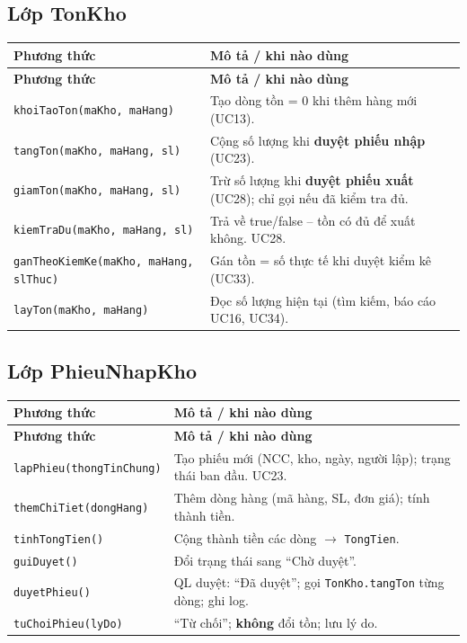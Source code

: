 \subsection{Lớp TonKho}

\begin{longtable}{|p{4.5cm}|p{8.2cm}|}
\hline
\textbf{Phương thức} & \textbf{Mô tả / khi nào dùng} \\
\hline
\endfirsthead
\hline
\textbf{Phương thức} & \textbf{Mô tả / khi nào dùng} \\
\hline
\endhead
\texttt{khoiTaoTon(maKho, maHang)} & Tạo dòng tồn = 0 khi thêm hàng mới (UC13). \\
\hline
\texttt{tangTon(maKho, maHang, sl)} & Cộng số lượng khi \textbf{duyệt phiếu nhập} (UC23). \\
\hline
\texttt{giamTon(maKho, maHang, sl)} & Trừ số lượng khi \textbf{duyệt phiếu xuất} (UC28); chỉ gọi nếu đã kiểm tra đủ. \\
\hline
\texttt{kiemTraDu(maKho, maHang, sl)} & Trả về true/false -- tồn có đủ để xuất không. UC28. \\
\hline
\texttt{ganTheoKiemKe(maKho, maHang, slThuc)} & Gán tồn = số thực tế khi duyệt kiểm kê (UC33). \\
\hline
\texttt{layTon(maKho, maHang)} & Đọc số lượng hiện tại (tìm kiếm, báo cáo UC16, UC34). \\
\hline
\end{longtable}

\subsection{Lớp PhieuNhapKho}

\begin{longtable}{|p{4.2cm}|p{8.5cm}|}
\hline
\textbf{Phương thức} & \textbf{Mô tả / khi nào dùng} \\
\hline
\endfirsthead
\hline
\textbf{Phương thức} & \textbf{Mô tả / khi nào dùng} \\
\hline
\endhead
\texttt{lapPhieu(thongTinChung)} & Tạo phiếu mới (NCC, kho, ngày, người lập); trạng thái ban đầu. UC23. \\
\hline
\texttt{themChiTiet(dongHang)} & Thêm dòng hàng (mã hàng, SL, đơn giá); tính thành tiền. \\
\hline
\texttt{tinhTongTien()} & Cộng thành tiền các dòng $\rightarrow$ \texttt{TongTien}. \\
\hline
\texttt{guiDuyet()} & Đổi trạng thái sang ``Chờ duyệt''. \\
\hline
\texttt{duyetPhieu()} & QL duyệt: ``Đã duyệt''; gọi \texttt{TonKho.tangTon} từng dòng; ghi log. \\
\hline
\texttt{tuChoiPhieu(lyDo)} & ``Từ chối''; \textbf{không} đổi tồn; lưu lý do. \\
\hline
\end{longtable}

